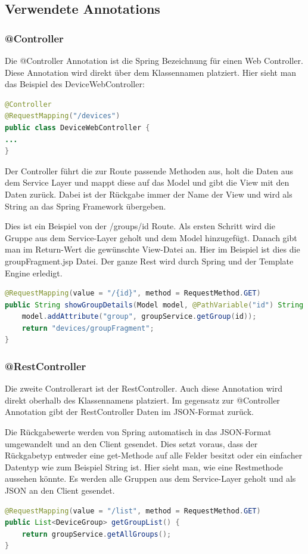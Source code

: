 \subsection{Verwendete Annotations}
\subsubsection{@Controller}
Die @Controller Annotation ist die Spring Bezeichnung für einen Web Controller. Diese Annotation wird direkt über dem Klassennamen platziert. Hier sieht man das Beispiel des DeviceWebController:
\begin{lstlisting}[language=java]
@Controller
@RequestMapping("/devices")
public class DeviceWebController {
...
}
\end{lstlisting}

Der Controller führt die zur Route passende Methoden aus, holt die Daten aus dem Service Layer und mappt diese auf das Model und gibt die View mit den Daten zurück. Dabei ist der Rückgabe immer der Name der View und wird als String an das Spring Framework übergeben.

Dies ist ein Beispiel von der /groups/id Route. Als ersten Schritt wird die Gruppe aus dem Service-Layer geholt und dem Model hinzugefügt. Danach gibt man im Return-Wert die gewünschte View-Datei an. Hier im Beispiel ist dies die groupFragment.jsp Datei. Der ganze Rest wird durch Spring und der Template Engine erledigt.
\begin{lstlisting}[language=java]
@RequestMapping(value = "/{id}", method = RequestMethod.GET)
public String showGroupDetails(Model model, @PathVariable("id") String id) {
	model.addAttribute("group", groupService.getGroup(id));
	return "devices/groupFragment";
}
\end{lstlisting}
\newpage

\subsubsection{@RestController}
Die zweite Controllerart ist der RestController. Auch diese Annotation wird direkt oberhalb des Klassennamens platziert. Im gegensatz zur @Controller Annotation gibt der RestController Daten im JSON-Format zurück. 

Die Rückgabewerte werden von Spring automatisch in das JSON-Format umgewandelt und an den Client gesendet. Dies setzt voraus, dass der Rückgabetyp entweder eine get-Methode auf alle Felder besitzt oder ein einfacher Datentyp wie zum Beispiel String ist.
Hier sieht man, wie eine Restmethode aussehen könnte. Es werden alle Gruppen aus dem Service-Layer geholt und als JSON an den Client gesendet.
\begin{lstlisting}[language=java]
@RequestMapping(value = "/list", method = RequestMethod.GET)
public List<DeviceGroup> getGroupList() {
	return groupService.getAllGroups();
}
\end{lstlisting}

